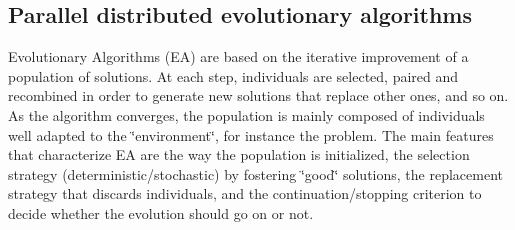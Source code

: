 \subsection{Parallel distributed evolutionary algorithms}\label{main_parallel_distributed}
Evolutionary Algorithms (EA) are based on the iterative improvement of a population of solutions. At each step, individuals are selected, paired and recombined in order to generate new solutions that replace other ones, and so on. As the algorithm converges, the population is mainly composed of individuals well adapted to the \char`\"{}environment\char`\"{}, for instance the problem. The main features that characterize EA are the way the population is initialized, the selection strategy (deterministic/stochastic) by fostering \char`\"{}good\char`\"{} solutions, the replacement strategy that discards individuals, and the continuation/stopping criterion to decide whether the evolution should go on or not.

